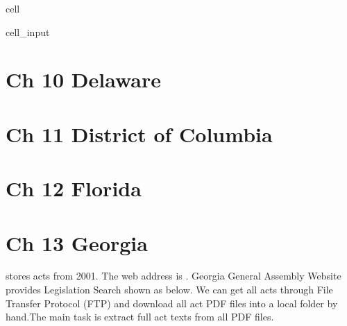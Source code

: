 \documentclass[letterpaper,10pt,english]{jupyterBook}
\begin{document}
\begin{sphinxuseclass}{cell}
\begin{sphinxVerbatimInput}
\begin{sphinxuseclass}{cell_input}
\begin{sphinxVerbatim}[commandchars=\\\{\}]
\PYG{p}{[}\PYG{p}{]}
                             

\end{sphinxVerbatim}

\end{sphinxuseclass}\end{sphinxVerbatimInput}

\end{sphinxuseclass}
\sphinxstepscope


\chapter{Ch 10 Delaware}
\label{\detokenize{ch10:ch-10-delaware}}\label{\detokenize{ch10::doc}}
\sphinxstepscope


\chapter{Ch 11 District of Columbia}
\label{\detokenize{ch11:ch-11-district-of-columbia}}\label{\detokenize{ch11::doc}}
\sphinxstepscope


\chapter{Ch 12 Florida}
\label{\detokenize{ch12:ch-12-florida}}\label{\detokenize{ch12::doc}}
\sphinxstepscope


\chapter{Ch 13 Georgia}
\label{\detokenize{ch13:ch-13-georgia}}\label{\detokenize{ch13::doc}}
\sphinxAtStartPar
{} stores acts from 2001. The web address is . Georgia General Assembly Website provides Legislation Search shown as below. We can get all acts through File Transfer Protocol (FTP) and download all act PDF files into a local folder by hand.The main task is extract full act texts from all PDF files.
\end{document}

